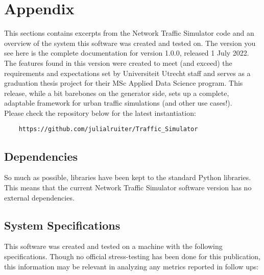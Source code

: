 \chapter{Appendix}
\label{Appendix}

\par This sections contains excerpts from the Network Traffic Simulator code and an overview of the system this software was created and tested on.  The version you see here is the complete documentation for version 1.0.0, released  1 July 2022.  \\

\noindent The features found in this version were created to meet (and exceed) the requirements and expectations set  by Universiteit Utrecht staff and serves as a graduation thesis project for their MSc Applied Data Science program.  This release, while a bit barebones on the generator side, sets up a complete, adaptable framework for urban traffic simulations (and other use cases!). \\

\noindent Please check the repository below for the latest instantiation:
\begin{verbatim}
    https://github.com/julialruiter/Traffic_Simulator
\end{verbatim} 

\section{Dependencies}
So much as possible, libraries have been kept to the standard Python libraries.  This means that the current Network Traffic Simulator software version has no external dependencies.

\section{System Specifications}
This software was created and tested on a machine with the following specifications.  Though no official stress-testing has been done for this publication, this information may be relevant in analyzing any metrics reported in follow ups: \\

